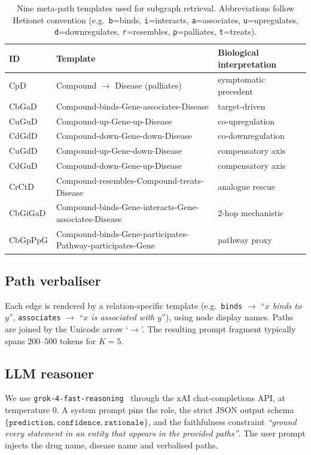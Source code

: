 \documentclass{article}
\begin{document}
\begin{table}[t]
\centering
\small
\caption{Nine meta-path templates used for subgraph retrieval. Abbreviations follow Hetionet convention (e.g.\ \texttt{b}=binds, \texttt{i}=interacts, \texttt{a}=associates, \texttt{u}=upregulates, \texttt{d}=downregulates, \texttt{r}=resembles, \texttt{p}=palliates, \texttt{t}=treats).}
\label{tab:metapaths}
\begin{tabular}{@{}lll@{}}
\toprule
ID & Template & Biological interpretation \\
\midrule
CpD      & Compound $\to$ Disease (palliates)                               & symptomatic precedent \\
CbGaD    & Compound-binds-Gene-associates-Disease                           & target-driven \\
CuGuD    & Compound-up-Gene-up-Disease                                      & co-upregulation \\
CdGdD    & Compound-down-Gene-down-Disease                                  & co-downregulation \\
CuGdD    & Compound-up-Gene-down-Disease                                    & compensatory axis \\
CdGuD    & Compound-down-Gene-up-Disease                                    & compensatory axis \\
CrCtD    & Compound-resembles-Compound-treats-Disease                       & analogue rescue \\
CbGiGaD  & Compound-binds-Gene-interacts-Gene-associates-Disease            & 2-hop mechanistic \\
CbGpPpG  & Compound-binds-Gene-participates-Pathway-participates-Gene       & pathway proxy \\
\bottomrule
\end{tabular}
\end{table}

\subsection{Path verbaliser}
Each edge is rendered by a relation-specific template (e.g.\ \texttt{binds} $\to$ ``\textit{$x$ binds to $y$}'', \texttt{associates} $\to$ ``\textit{$x$ is associated with $y$}''), using node display names. Paths are joined by the Unicode arrow `$\to$'. The resulting prompt fragment typically spans $200$--$500$ tokens for $K{=}5$.

\subsection{LLM reasoner}
\label{sec:method:llm}
We use \texttt{grok-4-fast-reasoning}~\citep{xai2024grok} through the xAI chat-completions API, at temperature $0$. A system prompt pins the role, the strict JSON output schema $\{\texttt{prediction},\texttt{confidence},\texttt{rationale}\}$, and the faithfulness constraint \emph{``ground every statement in an entity that appears in the provided paths''}. The user prompt injects the drug name, disease name and verbalised paths.
\end{document}
